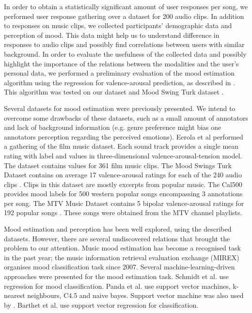 \documentclass[a4paper]{article}
\begin{document}
In order to obtain a statistically significant amount of user responses per song, we performed user response gathering over a dataset for 200 audio clips. In addition to responses on music clips, we collected participants' demographic data and perception of mood. This data might help us to understand difference in responses to audio clips and possibly find correlations between users with similar background. In order to evaluate the usefulness of the collected data and possibly highlight the importance of the relations between the modalities and the user's personal data, we performed a preliminary evaluation of the mood estimation algorithm using the regression for valence-arousal prediction, as described in \cite{schmidt2009projection}. This algorithm was tested on our dataset and Mood Swing Turk dataset \cite{schmidt2011modeling}.

Several datasets for mood estimation were previously presented. We intend to overcome some drawbacks of these datasets, such as a small amount of annotators and lack of background information (e.g. genre preference might bias one annotators perception regarding the perceived emotions). Eerola et al \cite{eerola2010comparison} performed a gathering of the film music dataset. Each sound track provides a single mean rating with label and values in three-dimensional valence-arousal-tension model. The dataset contains values for 361 film music clips. The Mood Swings Turk Dataset contains on average 17 valence-arousal ratings for each of the 240 audio clips \cite{schmidt2011modeling}. Clips in this dataset are mostly excerpts from popular music. The Cal500 provides mood labels for 500 western popular songs \cite{turnbull2008semantic} encompassing 3 annotations per song. The MTV Music Dataset contains 5 bipolar valence-arousal ratings for 192 popular songs \cite{schuller2010mister}. These songs were obtained from the MTV channel playlists.

Mood estimation and perception has been well explored, using the described datasets. However, there are several undiscovered relations that brought the problem to our attention. Music mood estimation has become a recognised task in the past year; the music information retrieval evaluation exchange (MIREX) organises mood classification task since 2007. Several machine-learning-driven approaches were presented for the mood estimation task. Schmidt et al. \cite{schmidt2009projection} use regression for mood classification. Panda et al. \cite{panda2013multi} use support vector machines, k-nearest neighbours, C4.5 and naive bayes. Support vector machine was also used by \cite{laurier2007audio}. Barthet et al. \cite{barthet2013design} use support vector regression for classification. 
\end{document}
